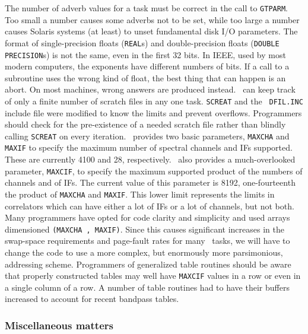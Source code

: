 \begin{description}
 The number of adverb values for a task must be
    correct in the call to \hbox{{\tt GTPARM}}.  Too small a number
    causes some adverbs not to be set, while too large a number causes
    Solaris systems (at least) to unset fundamental disk I/O
    parameters.
 The format of single-precision floats ({\tt REAL}s) and
    double-precision floats ({\tt DOUBLE PRECISION}s) is not the same,
    even in the first 32 bits.  In IEEE, used by most modern
    computers, the exponents have different numbers of bits.  If a
    call to a subroutine uses the wrong kind of float, the best thing
    that can happen is an abort.  On most machines, wrong answers are
    produced instead.
 \AIPS\ can keep track of only a finite number
    of scratch files in any one task.  {\tt SCREAT} and the {\tt
    DFIL.INC} include file were modified to know the limits and
    prevent overflows.  Programmers should check for the pre-existence
    of a needed scratch file rather than blindly calling {\tt SCREAT}
    on every iteration.
 \AIPS\ provides two basic parameters, {\tt MAXCHA} and
    {\tt MAXIF} to specify the maximum number of spectral channels and
    IFs supported.  These are currently 4100 and 28, respectively.
    \AIPS\ also provides a much-overlooked parameter, {\tt MAXCIF}, to
    specify the maximum supported product of the numbers of channels
    and of IFs.  The current value of this parameter is 8192,
    one-fourteenth the product of {\tt MAXCHA} and \hbox{{\tt MAXIF}}.
    This lower limit represents the limits in correlators which can
    have either a lot of IFs or a lot of channels, but not both.
    Many programmers have opted for code clarity and simplicity and
    used arrays dimensioned {\tt (MAXCHA , \hbox{MAXIF})}.  Since this
    causes significant increases in the swap-space requirements and
    page-fault rates for many \AIPS\ tasks, we will have to change the
    code to use a more complex, but enormously more parsimonious,
    addressing scheme.
 Programmers of generalized table routines should be
    aware that properly constructed tables may well have {\tt MAXCIF}
    values in a row or even in a single column of a row.  A number of
    table routines had to have their buffers increased to account for
    recent bandpass tables.
\end{description}

\subsubsection{Miscellaneous matters}


